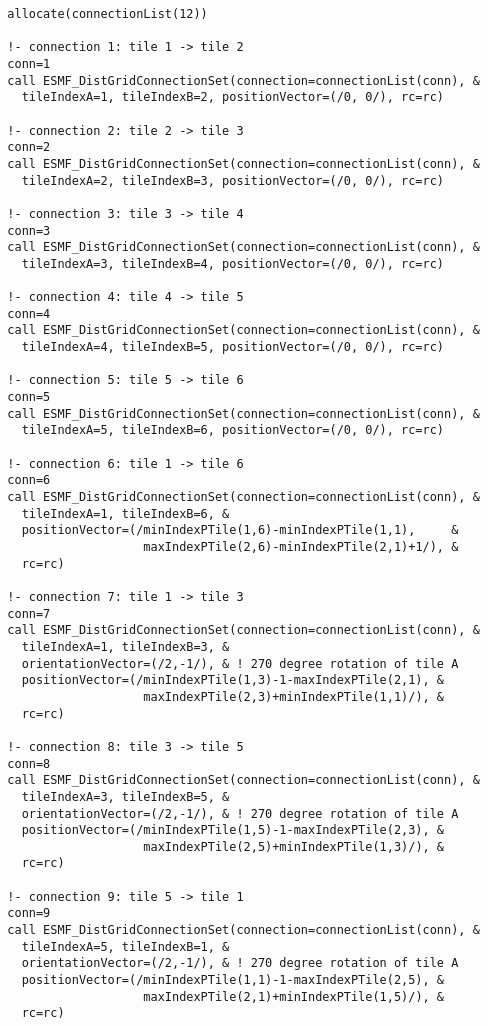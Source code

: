  \begin{verbatim}
  allocate(connectionList(12))

  !- connection 1: tile 1 -> tile 2
  conn=1
  call ESMF_DistGridConnectionSet(connection=connectionList(conn), &
    tileIndexA=1, tileIndexB=2, positionVector=(/0, 0/), rc=rc)

  !- connection 2: tile 2 -> tile 3
  conn=2
  call ESMF_DistGridConnectionSet(connection=connectionList(conn), &
    tileIndexA=2, tileIndexB=3, positionVector=(/0, 0/), rc=rc)

  !- connection 3: tile 3 -> tile 4
  conn=3
  call ESMF_DistGridConnectionSet(connection=connectionList(conn), &
    tileIndexA=3, tileIndexB=4, positionVector=(/0, 0/), rc=rc)

  !- connection 4: tile 4 -> tile 5
  conn=4
  call ESMF_DistGridConnectionSet(connection=connectionList(conn), &
    tileIndexA=4, tileIndexB=5, positionVector=(/0, 0/), rc=rc)

  !- connection 5: tile 5 -> tile 6
  conn=5
  call ESMF_DistGridConnectionSet(connection=connectionList(conn), &
    tileIndexA=5, tileIndexB=6, positionVector=(/0, 0/), rc=rc)

  !- connection 6: tile 1 -> tile 6
  conn=6
  call ESMF_DistGridConnectionSet(connection=connectionList(conn), &
    tileIndexA=1, tileIndexB=6, &
    positionVector=(/minIndexPTile(1,6)-minIndexPTile(1,1),     &
                     maxIndexPTile(2,6)-minIndexPTile(2,1)+1/), &
    rc=rc)

  !- connection 7: tile 1 -> tile 3
  conn=7
  call ESMF_DistGridConnectionSet(connection=connectionList(conn), &
    tileIndexA=1, tileIndexB=3, &
    orientationVector=(/2,-1/), & ! 270 degree rotation of tile A
    positionVector=(/minIndexPTile(1,3)-1-maxIndexPTile(2,1), &
                     maxIndexPTile(2,3)+minIndexPTile(1,1)/), &
    rc=rc)

  !- connection 8: tile 3 -> tile 5
  conn=8
  call ESMF_DistGridConnectionSet(connection=connectionList(conn), &
    tileIndexA=3, tileIndexB=5, &
    orientationVector=(/2,-1/), & ! 270 degree rotation of tile A
    positionVector=(/minIndexPTile(1,5)-1-maxIndexPTile(2,3), &
                     maxIndexPTile(2,5)+minIndexPTile(1,3)/), &
    rc=rc)

  !- connection 9: tile 5 -> tile 1
  conn=9
  call ESMF_DistGridConnectionSet(connection=connectionList(conn), &
    tileIndexA=5, tileIndexB=1, &
    orientationVector=(/2,-1/), & ! 270 degree rotation of tile A
    positionVector=(/minIndexPTile(1,1)-1-maxIndexPTile(2,5), &
                     maxIndexPTile(2,1)+minIndexPTile(1,5)/), &
    rc=rc)


\end{verbatim}
